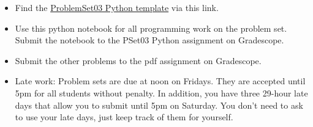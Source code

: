 \documentclass[12pt,letterpaper,noanswers]{exam}
\begin{document}
 \pdfpageheight 11in 
  \pdfpagewidth 8.5in

\begin{itemize}
    \itemsep0pt
    \item Find the \href{https://github.com/sarah1123/ScientificComputing-APMTH111/blob/main/2023Fall/PythonFiles/03_moreleastsquares/ProblemSet03.ipynb}{ProblemSet03 Python template} via this link.
    \item Use this python notebook for all programming work on the problem set.  Submit the notebook to the PSet03 Python assignment on Gradescope.
    \item Submit the other problems to the pdf assignment on Gradescope.
    \item Late work: Problem sets are due at noon on Fridays.  They are accepted until 5pm for all students without penalty.  In addition, you have three 29-hour late days that allow you to submit until 5pm on Saturday.  You don't need to ask to use your late days, just keep track of them for yourself.
\end{itemize}
\end{document}
